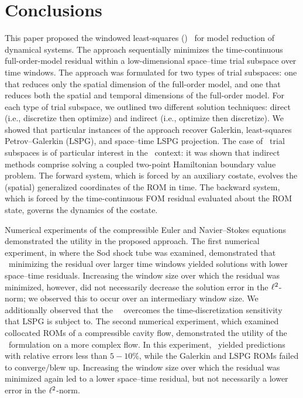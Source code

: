\documentclass[3p,computermodern,10pt]{elsarticle}
\begin{document}
%
%






\section{Conclusions}\label{sec:conclude}
This paper proposed the windowed least-squares (\methodAcronym) \approachKwd\ for model reduction  of dynamical systems. The approach sequentially minimizes the
	time-continuous full-order-model residual within a low-dimensional space--time trial
	subspace over time windows. The approach was formulated for two types of trial subspaces: one that reduces only the spatial dimension of the full-order model, and one that reduces both the spatial and temporal dimensions of the full-order model. For each type of trial
	subspace, we outlined two different solution techniques: direct (i.e.,
	discretize then optimize) and indirect (i.e., optimize then discretize). We showed that particular instances of the approach recover Galerkin,
	least-squares Petrov--Galerkin (LSPG), and space–time LSPG projection.  
The case of \spatialAcronym\ trial subspaces is of particular interest in the \methodAcronym\ context: it was shown that indirect methods comprise solving a coupled two-point 
Hamiltonian boundary value problem.
The forward system, which is forced by an auxiliary costate,
		evolves the (spatial) generalized coordinates of the ROM in time. The
		backward system, which is forced by the time-continuous FOM residual
		evaluated about the ROM state, governs the dynamics of the costate. 

Numerical experiments of the compressible Euler and Navier--Stokes equations demonstrated the utility in the proposed approach. The first numerical experiment, in where the Sod shock tube was examined, demonstrated that \methodAcronymROMs\ minimizing the residual over larger time windows yielded solutions with lower space--time residuals. Increasing the window size over which the residual was minimized, however, did not necessarily decrease the solution error in the $\ell^2$-norm; we observed this to occur over an intermediary window size. We additionally observed that the  
\methodAcronym\ \approachKwd\ overcomes the time-discretization sensitivity that LSPG is subject to. The second numerical experiment, which examined collocated ROMs of a compressible cavity flow, demonstrated the utility of the \methodAcronym\ formulation on a more complex flow. In this experiment, \methodAcronymROMs\ yielded predictions with relative errors less than $5-10\%$, while the Galerkin and LSPG ROMs failed to converge/blew up. Increasing the window size over which the residual was minimized again led to a lower space--time residual, but not necessarily a lower error in the $\ell^2$-norm.
\end{document}
